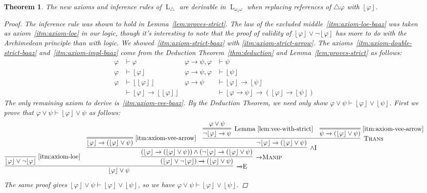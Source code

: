 \documentclass{amsart}
\newtheorem{theorem}{Theorem}[section]
\theoremstyle{definition}
\numberwithin{equation}{theorem}
\renewcommand{\phi}{\varphi}
\newcommand{\unwedge}{{\wedge}}
\newcommand{\proves}{\vdash}
\newcommand{\strict}[1]{{\left\lfloor#1\right\rfloor}}
\newcommand{\narrow}[1]{\xrightarrow{#1}}
\renewcommand{\to}{\narrow{}}
\newcommand{\arr}{{\to}}
\newcommand{\intro}{\!\operatorname{I}}
\newcommand{\elim}{\!\operatorname{E}}
\newcommand{\trans}{\text{\sc{Trans}}}
\newcommand{\aref}[1]{\!\text{\ref{itm:axiom-#1}}}
\newcommand{\pushdown}{\arr\text{\sc{Manip}}}
\newcommand{\baselang}{\operatorname{L}}
\newcommand{\lang}{\baselang_{\omega_1\omega}}
\begin{document}
\begin{theorem}
  The new axioms and inference rules of $\baselang_\triangle$ are derivable in $\lang$ when replacing references of $\triangle\phi$ with $\strict\phi$.
  \begin{proof}
    The inference rule was shown to hold in Lemma~\ref{lem:proves-strict}.
    The law of the excluded middle~\ref{itm:axiom-loe-baaz} was taken as axiom~\ref{itm:axiom-loe} in our logic, though it's interesting to note that the proof of validity of $\strict{\phi}\vee\neg\strict\phi$ has more to do with the Archimedean principle than with logic.
    We showed~\ref{itm:axiom-strict-baaz} with \ref{itm:axiom-strict-arrow}.
    The axioms~\ref{itm:axiom-double-strict-baaz} and~\ref{itm:axiom-impl-baaz} come from the Deduction Theorem~\ref{thm:deduction} and Lemma~\ref{lem:proves-strict} as follows:
    \begin{align*}
      \phi&\proves\phi&  \phi\to\psi,\phi&\proves\psi\\
      \phi&\proves\strict\phi&  \phi\to\psi,\phi&\proves\strict\psi\\
      \phi&\proves\strict{\strict\phi}&  \phi\to\psi&\proves\strict\phi\to\strict\psi\\
      &\proves\strict{\phi}\to\strict{\strict\phi}&
      &\proves\strict{\phi\to\psi}\to(\strict\phi\to\strict\psi)
    \end{align*}
    The only remaining axiom to derive is~\ref{itm:axiom-vee-baaz}.
    By the Deduction Theorem, we need only show $\phi\vee\psi\proves\strict\phi\vee\strict\psi$.
    First we prove that $\phi\vee\psi\proves\strict\phi\vee\psi$ as follows:
    \[
      \infer[\arr\elim]{\strict\phi\vee\psi}{
        \infer[\aref{loe}]{\strict\phi\vee\neg\strict\phi}{} &
        \infer[\pushdown]{(\strict\phi\vee\neg\strict\phi)\to(\strict\phi\vee\psi)}{
          \infer[\unwedge\intro]{(\strict\phi\to(\strict\phi\vee\psi))\wedge(\neg\strict\phi\to(\strict\phi\vee\psi)}{
            \infer=[\aref{vee-arrow}]{\strict\phi\to(\strict\phi\vee\psi)}{} &
            \infer[\trans]{\neg\strict\phi\to(\strict\phi\vee\psi)}{
              \infer=[\text{Lemma~\ref{lem:vee-with-strict}}]{\neg\strict\phi\to\psi}{\phi\vee\psi} &
              \infer=[\aref{vee-arrow}]{\psi\to(\strict\phi\vee\psi)}{}
            }
          }
        }
      }
    \]
    The same proof gives $\strict\phi\vee\psi\proves\strict\phi\vee\strict\psi$, so we have $\phi\vee\psi\proves\strict\phi\vee\strict\psi$.
  \end{proof}
\end{theorem}
\end{document}
